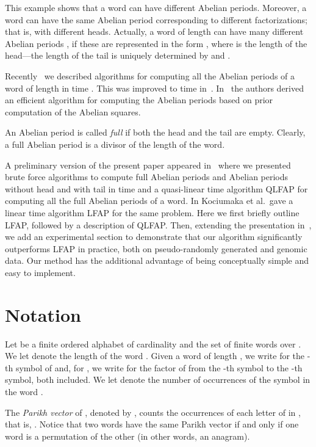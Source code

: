 \documentclass[3p]{elsarticle}
\begin{document}
This example shows that a word can have different Abelian periods. Moreover, a word can have the same Abelian period  corresponding to different factorizations; that is, with different heads. Actually, a word of length  can have  many different Abelian periods \cite{DAM}, if these are represented in the form , where  is the length of the head---the length of the tail is uniquely determined by  and .

Recently~\cite{PSC2011-16,DAM} we described algorithms for computing all the
 Abelian periods
 of a word of length  in time .
This was improved to time  in~\cite{MichalisChrist2012}.
In~\cite{CIKKPRRTW2012} the authors derived an 
 efficient
 algorithm for computing the Abelian periods 
based on prior computation of the Abelian squares.

An Abelian period is called \emph{full} if both the head and the tail are empty. Clearly, a full Abelian period is a divisor of the length of the word.

A preliminary version of the present paper appeared in~\cite{FiLeLePrSm12}
 where we presented brute force algorithms to compute full Abelian periods
 and Abelian periods without head and with tail in  time and a 
 quasi-linear time algorithm QLFAP for
 computing all the full Abelian periods of a word.
In \cite{KoRaRy13} Kociumaka et al.~gave a linear time algorithm LFAP for the same problem.
Here we first briefly outline LFAP,
followed by a description of QLFAP.
Then, extending the presentation in~\cite{FiLeLePrSm12},
we add an experimental section to demonstrate that our algorithm
significantly outperforms LFAP in practice,
both on pseudo-randomly generated and genomic data.
Our method has the additional
advantage of being conceptually simple and easy to implement.
  
\section{Notation}
\label{sec-def}

Let  be a finite ordered
 alphabet of cardinality  and  the set of finite words
 over . 
We let  denote the length of the word .
Given a word  of length , we write  for the -th symbol of 
 and, for , we write  for the factor of 
 from the -th symbol to the -th symbol, both included.
We let  denote the number of occurrences of the symbol
  in the word . 

The \emph{Parikh vector} of , denoted by ,
 counts the
 occurrences of each letter of  in , that is, 
 .
Notice that two words have the same Parikh vector if and only if
 one word is a permutation of the other (in other words, an anagram).
\end{document}
